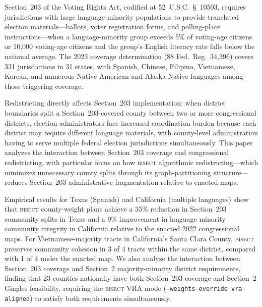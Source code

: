 Section~203 of the Voting Rights Act, codified at 52~U.S.C.~\S~10503,
requires jurisdictions with large language-minority populations to provide
translated election materials---ballots, voter registration forms, and
polling-place instructions---when a language-minority group exceeds 5\%
of voting-age citizens or 10,000 voting-age citizens and the group's
English literacy rate falls below the national average. The 2023 coverage
determination (88 Fed.\ Reg.\ 34,396) covers 331 jurisdictions in 31 states,
with Spanish, Chinese, Filipino, Vietnamese, Korean, and numerous Native
American and Alaska Native languages among those triggering coverage.

Redistricting directly affects Section~203 implementation: when district
boundaries split a Section~203-covered county between two or more congressional
districts, election administrators face increased coordination burden because
each district may require different language materials, with county-level
administration having to serve multiple federal election jurisdictions
simultaneously. This paper analyzes the interaction between Section~203
coverage and congressional redistricting, with particular focus on how
\textsc{bisect} algorithmic redistricting---which minimizes unnecessary
county splits through its graph-partitioning structure---reduces Section~203
administrative fragmentation relative to enacted maps.

Empirical results for Texas (Spanish) and California (multiple languages)
show that \textsc{bisect} county-weight plans achieve a 35\% reduction in
Section~203 community splits in Texas and a 9\% improvement in language
minority community integrity in California relative to the enacted 2022
congressional maps. For Vietnamese-majority tracts in California's Santa
Clara County, \textsc{bisect} preserves community cohesion in 3 of 4
tracts within the same district, compared with 1 of 4 under the enacted map.
We also analyze the interaction between Section~203 coverage and Section~2
majority-minority district requirements, finding that 23 counties nationally
have both Section~203 coverage and Section~2 Gingles feasibility, requiring
the \textsc{bisect} VRA mode (\texttt{--weights-override vra-aligned}) to
satisfy both requirements simultaneously.
